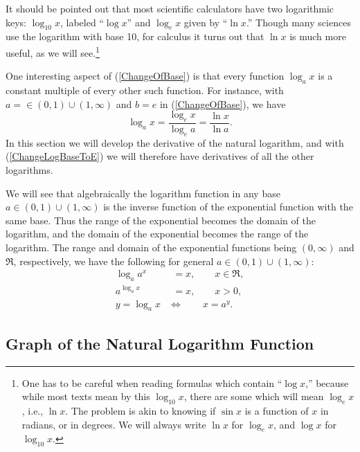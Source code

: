It should be pointed out that most scientific calculators have
two logarithmic keys:
$\log_{10}x$, labeled ``$\log x$'' and $\log_ex$
given by ``$\ln x$.''  Though many sciences use the 
logarithm with base 10, for calculus it turns out that
$\ln x$ is much more useful, as we will see.\footnote{%
One has to be careful when reading formulas which contain
``$\log x$,'' because while most texts mean by this $\log_{10}x$,
there are some which will mean $\log_ex$, i.e., $\ln x$.
The problem is akin to knowing if $\sin x$ is a function of
$x$ in radians, or in degrees.  We will always write
$\ln x$ for $\log_{e}x$, and $\log x$ for $\log_{10}x$.   
}

One interesting aspect of (\ref{ChangeOfBase}) is that
every function $\log_ax$ is a constant multiple of every
other such function.  For instance, with $a=\in(0,1)\cup(1,\infty)$
and $b=e$ in (\ref{ChangeOfBase}), we have
\begin{equation}
\log_ax=\frac{\log_ex}{\log_ea}=\frac{\ln x}{\ln a}.
\label{ChangeLogBaseToE}\end{equation}
In this section we will develop the derivative of the natural
logarithm, and with (\ref{ChangeLogBaseToE}) we will therefore have
derivatives of all the other logarithms.

We will see that algebraically
the logarithm function in any base $a\in(0,1)\cup(1,\infty)$
is the inverse function of the exponential function with the same
base.  Thus the range of the exponential becomes the domain
of the logarithm, and the domain of the exponential becomes the
range of the logarithm.  The range and domain of the exponential
functions being $(0,\infty)$ and $\Re$, respectively, we have 
the following for general $a\in(0,1)\cup(1,\infty)$:
\begin{align}
\log_a a^x&\ \ =x,\qquad x\in\Re,\\
a^{\log_ax}&\ \ =x,\qquad x>0,\\
y=\log_ax&\iff \qquad x=a^y.\label{Log<->Exponential}
\end{align}
\subsection{Graph of the  Natural Logarithm Function}


